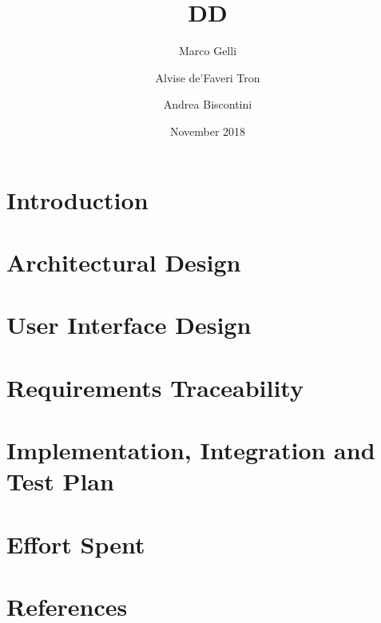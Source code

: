 \documentclass[12pt]{article}
\title{DD}
\author{Marco Gelli \and Alvise de'Faveri Tron \and Andrea Biscontini}
\date{November 2018}
\begin{document}


\newpage

\tableofcontents

\section{Introduction}


\newpage

\section{Architectural Design}


\newpage

\section{User Interface Design}


\newpage

\section{Requirements Traceability}


\newpage

\section{Implementation, Integration and Test Plan}


\newpage

\section{Effort Spent}


\newpage

\section{References}

\end{document}
